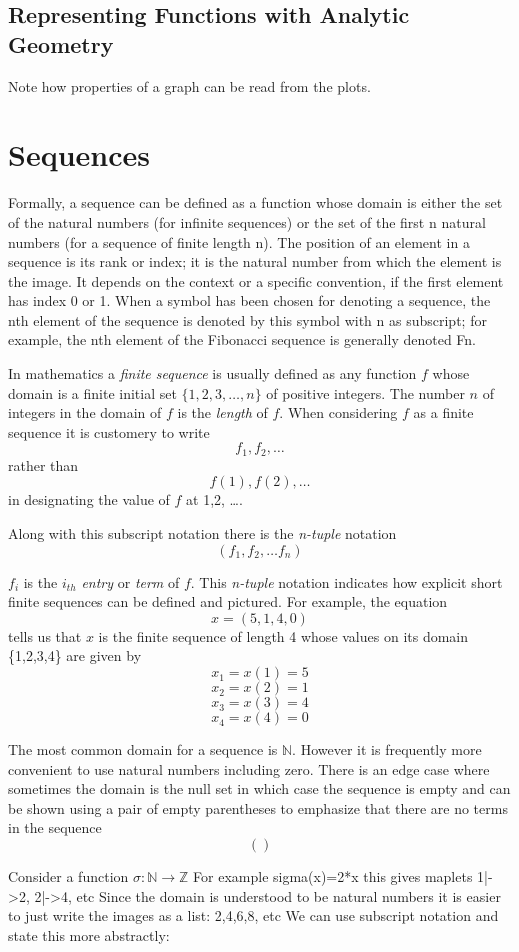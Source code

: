 \documentclass[11pt]{book} %
\theoremstyle {definition}
\theoremstyle {remark}
\begin{document}
    \subsection {Representing Functions with Analytic Geometry}
Note how properties of a graph can be read from the plots.

\section {Sequences}
Formally, a sequence can be defined as a function whose domain is either the set of the natural numbers (for infinite sequences) or the set of the first n natural numbers (for a sequence of finite length n). The position of an element in a sequence is its rank or index; it is the natural number from which the element is the image. It depends on the context or a specific convention, if the first element has index 0 or 1. When a symbol has been chosen for denoting a sequence, the nth element of the sequence is denoted by this symbol with n as subscript; for example, the nth element of the Fibonacci sequence is generally denoted Fn.

In mathematics a \textit{finite sequence} is usually defined as any function $f$ whose domain is a finite initial set $\{1,2,3, \dots ,n\}$ of positive integers. The number $n$ of integers in the domain of $f$ is the \textit{length} of $f$. When considering $f$ as a finite sequence it is customery to write
$$f_1,f_2, \dots$$
rather than
$$f(1),f(2), \dots$$
in designating the value of $f$ at 1,2, \dots.

Along with this subscript notation there is the \textit{n-tuple} notation
$$(f_1,f_2, \dots f_n)$$


$f_i$ is the $i_{th}$ \textit{entry} or \textit{term} of $f$. This \textit{n-tuple} notation indicates how explicit short finite sequences can be defined and pictured. For example, the equation  
$$x=(5,1,4,0)$$
tells us that $x$ is the finite sequence of length 4 whose values on its domain \{1,2,3,4\} are given by
$$x_1=x(1)=5$$
$$x_2=x(2)=1$$
$$x_3=x(3)=4$$
$$x_4=x(4)=0$$

The most common domain for a sequence is $\mathbb{N}$. However it is frequently more convenient to use natural numbers including zero. There is an edge case where sometimes the domain is the null set in which case the sequence is empty and can be shown using a pair of empty parentheses to emphasize that there are no terms in the sequence
$$(  )$$

Consider a function $\sigma:\mathbb{N} \rightarrow \mathbb{Z}$
For example sigma(x)=2*x
this gives maplets 1|->2, 2|->4, etc
Since the domain is understood to be natural numbers it is easier to just write the images as a list:
2,4,6,8, etc
We can use subscript notation and state this more abstractly:
\end{document}
